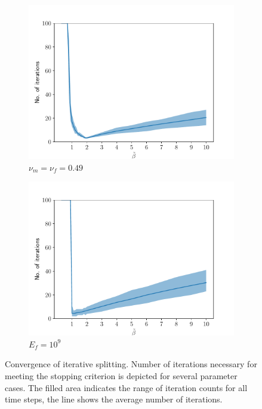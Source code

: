 \documentclass[a4paper]{article}
\numberwithin{equation}{section}
\begin{document}
\begin{figure}
\begin{subfigure}[b]{0.49\textwidth}
\centering
\includegraphics[width=\textwidth]{figures/conv_result_linear_dt_100_alpha_1_cond_9p81e-18_Er_6e+10_Ef_1e+06_nur_0p49_nuf_0p49.pdf}
\caption{$\nu_m=\nu_f=0.49$}
\end{subfigure}
% 
\begin{subfigure}[b]{0.49\textwidth}
\centering
\includegraphics[width=\textwidth]{figures/conv_result_linear_dt_100_alpha_1_cond_9p81e-18_Er_6e+10_Ef_1e+09_nur_0_nuf_0.pdf}
\caption{$E_f=10^{9}$}
\end{subfigure}
\caption{Convergence of iterative splitting. Number of iterations necessary for meeting the stopping criterion is depicted for several parameter cases. The filled area indicates the range of iteration counts for all time steps, the line shows the average number of iterations.}
\label{fig:test_iterations}
\end{figure}
\end{document}
